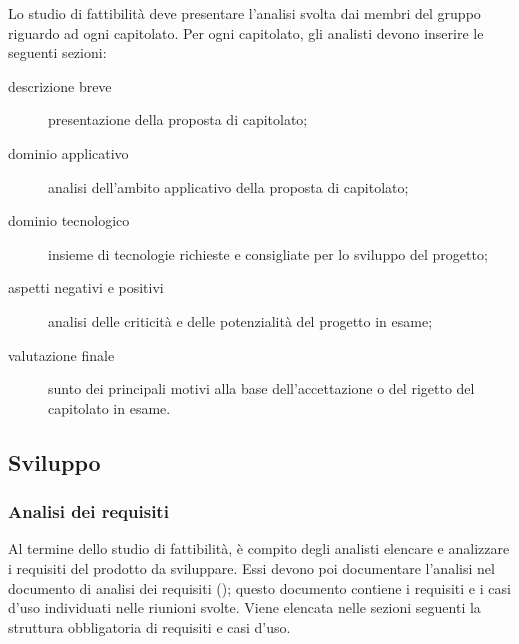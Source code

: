 	Lo studio di fattibilità deve presentare l'analisi svolta dai membri del gruppo riguardo ad ogni capitolato. Per ogni capitolato, gli analisti devono inserire le seguenti sezioni:
	\begin{description}
		\item[descrizione breve] presentazione della proposta di capitolato; 
		\item[dominio applicativo] analisi dell'ambito applicativo della proposta di capitolato; 
		\item[dominio tecnologico] insieme di tecnologie richieste e consigliate per lo sviluppo del progetto;
		\item[aspetti negativi e positivi] analisi delle criticità e delle potenzialità del progetto in esame;
		\item[valutazione finale] sunto dei principali motivi alla base dell'accettazione o del rigetto del capitolato in esame.
	\end{description}

\subsection{Sviluppo}
	\subsubsection{Analisi dei requisiti}
	Al termine dello studio di fattibilità, è compito degli analisti elencare e analizzare i requisiti del prodotto da sviluppare. Essi devono poi documentare l'analisi nel documento di analisi dei requisiti (\AdR); questo documento contiene i requisiti e i casi d'uso individuati nelle riunioni svolte.
	Viene elencata nelle sezioni seguenti la struttura obbligatoria di requisiti e casi d'uso.
